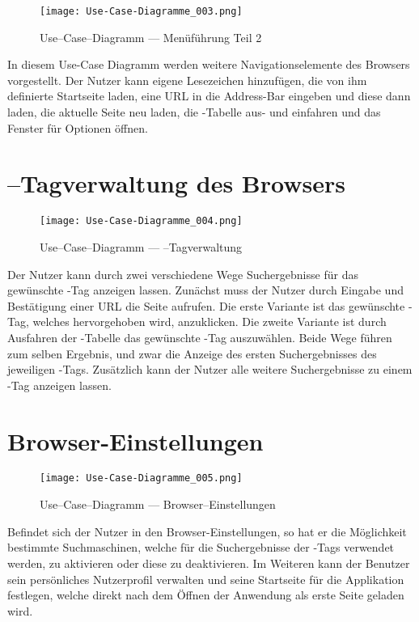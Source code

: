 \begin{figure}[htb]
\texttt{[image: Use-Case-Diagramme\_003.png]}
	\caption{Use--Case--Diagramm --- Menüführung Teil 2}
	\label{fig:Menüführung Teil 2}
\end{figure}
In diesem Use-Case Diagramm werden weitere Navigationselemente des Browsers vorgestellt. Der Nutzer kann eigene Lesezeichen hinzufügen, die von ihm definierte Startseite laden, eine URL in die Address-Bar eingeben und diese dann laden, die aktuelle Seite neu laden, die \SEARCH-Tabelle aus- und einfahren und das Fenster für Optionen öffnen.

\section{\SEARCH--Tagverwaltung des Browsers}
\begin{figure}[htb]
\texttt{[image: Use-Case-Diagramme\_004.png]}
	\caption{Use--Case--Diagramm --- \SEARCH--Tagverwaltung}
	\label{fig:\SEARCH-Tagverwaltung}
\end{figure}
Der Nutzer kann durch zwei verschiedene Wege Suchergebnisse für das gewünschte \SEARCH-Tag anzeigen lassen. Zunächst muss der Nutzer durch Eingabe und Bestätigung einer URL die Seite aufrufen. Die erste Variante ist das gewünschte \SEARCH-Tag, welches hervorgehoben wird, anzuklicken. Die zweite Variante ist durch Ausfahren der \SEARCH-Tabelle das gewünschte \SEARCH-Tag auszuwählen. Beide Wege führen zum selben Ergebnis, und zwar die Anzeige des ersten Suchergebnisses des jeweiligen \SEARCH-Tags. Zusätzlich kann der Nutzer alle weitere Suchergebnisse zu einem \SEARCH-Tag anzeigen lassen.

\section{Browser-Einstellungen}
\begin{figure}[htb]
\texttt{[image: Use-Case-Diagramme\_005.png]}
	\caption{Use--Case--Diagramm --- Browser--Einstellungen}
	\label{fig:Browser-Einstellungen}
\end{figure}
Befindet sich der Nutzer in den Browser-Einstellungen, so hat er die Möglichkeit bestimmte Suchmaschinen, welche für die Suchergebnisse der \SEARCH-Tags verwendet werden, zu aktivieren oder diese zu deaktivieren. Im Weiteren kann der Benutzer sein persönliches Nutzerprofil verwalten und seine Startseite für die Applikation festlegen, welche direkt nach dem Öffnen der Anwendung als erste Seite geladen wird.
